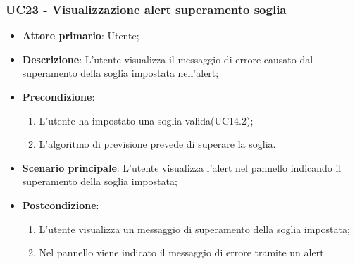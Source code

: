 \subsubsection{UC23 - Visualizzazione alert superamento soglia}
\label{sssec:uc23}
\begin{itemize}
  \item \textbf{Attore primario}: Utente;
  \item \textbf{Descrizione}: L'utente visualizza il messaggio di errore causato dal superamento della soglia impostata nell'alert;
  \item \textbf{Precondizione}:
  \begin{enumerate}
		\item L'utente ha impostato una soglia valida(UC14.2);
		\item L'algoritmo di previsione prevede di superare la soglia.
	\end{enumerate}
  \item \textbf{Scenario principale}:  L'utente visualizza l'alert nel pannello indicando il superamento della soglia impostata;
  \item \textbf{Postcondizione}:
  \begin{enumerate}
		\item L'utente visualizza un messaggio di superamento della soglia impostata;
		\item Nel pannello viene indicato il messaggio di errore tramite un alert.
	\end{enumerate}
\end{itemize}
